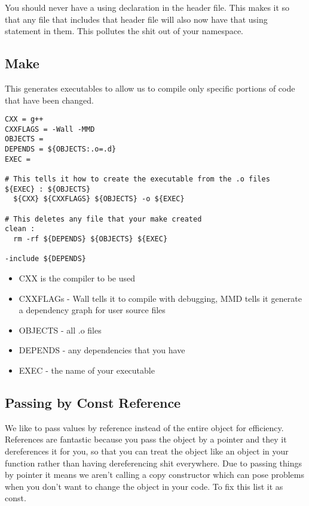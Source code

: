 \documentclass[12pt]{article}
\begin{document}
You should never have a using declaration in the header file. This makes it so that any file that includes that header file will also now have that using statement in them. This pollutes the shit out of your namespace.

\subsection*{Make}
This generates executables to allow us to compile only specific portions of code that have been changed.

\begin{lstlisting}
CXX = g++
CXXFLAGS = -Wall -MMD
OBJECTS =
DEPENDS = ${OBJECTS:.o=.d}
EXEC =

# This tells it how to create the executable from the .o files
${EXEC} : ${OBJECTS}
  ${CXX} ${CXXFLAGS} ${OBJECTS} -o ${EXEC}

# This deletes any file that your make created
clean :
  rm -rf ${DEPENDS} ${OBJECTS} ${EXEC}

-include ${DEPENDS}
\end{lstlisting}
\begin{itemize}
  \item CXX is the compiler to be used
  \item CXXFLAGs - Wall tells it to compile with debugging, MMD tells it generate a dependency graph for user source files
  \item OBJECTS - all .o files
  \item DEPENDS - any dependencies that you have
  \item EXEC - the name of your executable
\end{itemize}

\subsection*{Passing by Const Reference}
We like to pass values by reference instead of the entire object for efficiency. References are fantastic because you pass the object by a pointer and they it dereferences it for you, so that you can treat the object like an object in your function rather than having dereferencing shit everywhere. Due to passing things by pointer it means we aren't calling a copy constructor which can pose problems when you don't want to change the object in your code. To fix this list it as const.
\end{document}

